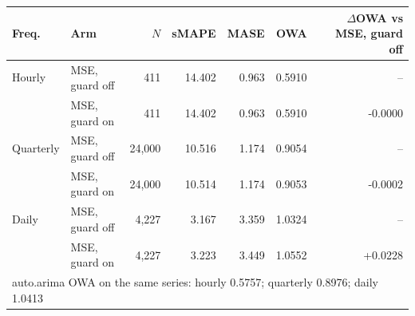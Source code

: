 \begin{tabular}{llrrrrr}
\toprule
Freq. & Arm & $N$ & sMAPE & MASE & OWA & $\Delta$OWA vs MSE, guard off \\
\midrule
Hourly & MSE, guard off & 411 & 14.402 & 0.963 & 0.5910 & -- \\
 & MSE, guard on & 411 & 14.402 & 0.963 & 0.5910 & -0.0000 \\
\addlinespace
Quarterly & MSE, guard off & 24{,}000 & 10.516 & 1.174 & 0.9054 & -- \\
 & MSE, guard on & 24{,}000 & 10.514 & 1.174 & 0.9053 & -0.0002 \\
\addlinespace
Daily & MSE, guard off & 4{,}227 & 3.167 & 3.359 & 1.0324 & -- \\
 & MSE, guard on & 4{,}227 & 3.223 & 3.449 & 1.0552 & +0.0228 \\
\midrule
\multicolumn{7}{l}{\footnotesize auto.arima OWA on the same series: hourly 0.5757; quarterly 0.8976; daily 1.0413} \\
\bottomrule
\end{tabular}
